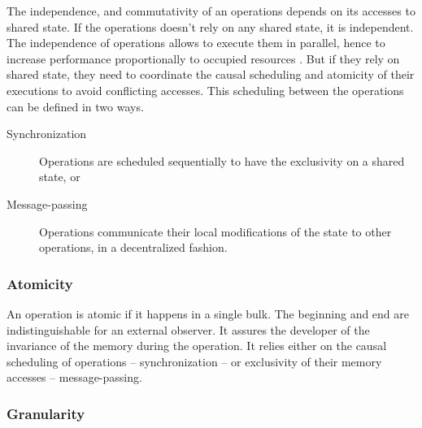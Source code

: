 The independence, and commutativity of an operations depends on its accesses to shared state.
If the operations doesn't rely on any shared state, it is independent.
The independence of operations allows to execute them in parallel, hence to increase performance proportionally to occupied resources \cite{Amdahl1967,Gunther1993}.
But if they rely on shared state, they need to coordinate the causal scheduling and atomicity of their executions to avoid conflicting accesses.
This scheduling between the operations can be defined in two ways.
\begin{description}
\item[Synchronization] Operations are scheduled sequentially to have the exclusivity on a shared state, or
\item[Message-passing] Operations communicate their local modifications of the state to other operations, in a decentralized fashion.
\end{description}

\subsubsection{Atomicity} \label{chapter3:definitions:efficiency:atomicity}

An operation is atomic if it happens in a single bulk.
The beginning and end are indistinguishable for an external observer.
It assures the developer of the invariance of the memory during the operation.
It relies either on the causal scheduling of operations -- synchronization -- or exclusivity of their memory accesses -- message-passing.

\subsubsection{Granularity} \label{chapter3:definitions:efficiency:granularity}

